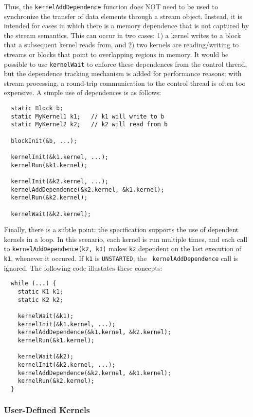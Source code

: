 Thus, the {\tt kernelAddDependence} function does NOT need to be used
to synchronize the transfer of data elements through a stream object.
Instead, it is intended for cases in which there is a memory
dependence that is not captured by the stream semantics.  This can
occur in two cases: 1) a kernel writes to a block that a subsequent
kernel reads from, and 2) two kernels are reading/writing to streams
or blocks that point to overlapping regions in memory.  It would be
possible to use {\tt kernelWait} to enforce these dependences from the
control thread, but the dependence tracking mechanism is added for
performance reasons; with stream processing, a round-trip
communication to the control thread is often too expensive.  A simple
use of dependences is as follows:

{\small
\begin{verbatim}
  static Block b;
  static MyKernel1 k1;   // k1 will write to b
  static MyKernel2 k2;   // k2 will read from b

  blockInit(&b, ...);

  kernelInit(&k1.kernel, ...);  
  kernelRun(&k1.kernel);

  kernelInit(&k2.kernel, ...);
  kernelAddDependence(&k2.kernel, &k1.kernel);
  kernelRun(&k2.kernel);

  kernelWait(&k2.kernel);
\end{verbatim}}

Finally, there is a subtle point: the specification supports the use
of dependent kernels in a loop.  In this scenario, each kernel is run
multiple times, and each call to {\tt kernelAddDependence(k2, k1)}
makes {\tt k2} dependent on the last execution of {\tt k1}, whenever
it occured. If {\tt k1} is {\tt UNSTARTED}, the {\tt
kernelAddDependence} call is ignored. The following code illustates
these concepts:

{\small
\begin{verbatim}
  while (...) {
    static K1 k1;
    static K2 k2;

    kernelWait(&k1);
    kernelInit(&k1.kernel, ...);
    kernelAddDependence(&k1.kernel, &k2.kernel);
    kernelRun(&k1.kernel);

    kernelWait(&k2);
    kernelInit(&k2.kernel, ...);
    kernelAddDependence(&k2.kernel, &k1.kernel);
    kernelRun(&k2.kernel);
  }
\end{verbatim}}

\subsubsection{User-Defined Kernels}
\label{sec:kernelhlc}


